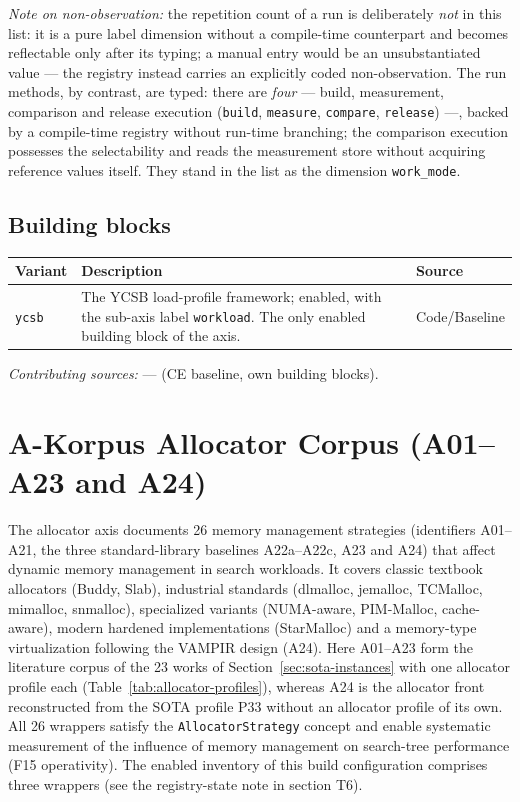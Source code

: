 \emph{Note on non-observation:} the repetition count of a run is deliberately \emph{not} in this list: it is a pure label dimension without a compile-time counterpart and becomes reflectable only after its typing; a manual entry would be an unsubstantiated value --- the registry instead carries an explicitly coded non-observation. The run methods, by contrast, are typed: there are \emph{four} --- build, measurement, comparison and release execution (\texttt{build}, \texttt{measure}, \texttt{compare}, \texttt{release}) ---, backed by a compile-time registry without run-time branching; the comparison execution possesses the selectability and reads the measurement store without acquiring reference values itself. They stand in the list as the dimension \texttt{work\_\allowbreak{}mode}.

\subsection*{Building blocks}

\begin{scriptsize}
\begin{longtable}{@{}>{\raggedright\arraybackslash}p{2.4cm} >{\raggedright\arraybackslash}p{7.6cm} >{\raggedright\arraybackslash}p{3.5cm}@{}}
\toprule
Variant & Description & Source \\
\midrule
\endhead%
\texttt{ycsb} & The YCSB load-profile framework; enabled, with the sub-axis label \texttt{workload}. The only enabled building block of the axis. & Code/\allowbreak{}Baseline \\
\bottomrule
\end{longtable}
\end{scriptsize}

\emph{Contributing sources:} --- (CE baseline, own building blocks).

\section{A-Korpus Allocator Corpus (A01--A23 and A24)}

The allocator axis documents 26 memory management strategies (identifiers A01--A21, the three standard-library baselines A22a--A22c, A23 and A24) that affect dynamic memory management in search workloads. It covers classic textbook allocators (Buddy, Slab), industrial standards (dlmalloc, jemalloc, TCMalloc, mimalloc, snmalloc), specialized variants (NUMA-aware, PIM-Malloc, cache-aware), modern hardened implementations (Star\allowbreak{}Malloc) and a memory-type virtualization following the VAMPIR design (A24). Here A01--A23 form the literature corpus of the 23 works of Section~\ref{sec:sota-instances} with one allocator profile each (Table~\ref{tab:allocator-profiles}), whereas A24 is the allocator front reconstructed from the SOTA profile P33 without an allocator profile of its own. All 26 wrappers satisfy the \texttt{Allocator\allowbreak{}Strategy} concept and enable systematic measurement of the influence of memory management on search-tree performance (F15 operativity). The enabled inventory of this build configuration comprises three wrappers (see the registry-state note in section T6).

